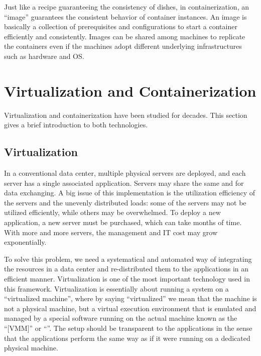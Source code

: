 Just like a recipe guaranteeing the consistency of dishes, in containerization, an ``image'' guarantees the consistent behavior of container instances. An image is basically a collection of prerequisites and configurations to start a container efficiently and consistently. Images can be shared among machines to replicate the containers even if the machines adopt different underlying infrastructures such as hardware and OS.

\section{Virtualization and Containerization}

Virtualization and containerization have been studied for decades. This section gives a brief introduction to both technologies.

\subsection{Virtualization}

In a conventional data center, multiple physical servers are deployed, and each server has a single associated application. Servers may share the same  and  for data exchanging. A big issue of this implementation is the utilization efficiency of the servers and the unevenly distributed loads: some of the servers may not be utilized efficiently, while others may be overwhelmed. To deploy a new application, a new server must be purchased, which can take months of time. With more and more servers, the management and IT cost may grow exponentially.

To solve this problem, we need a systematical and automated way of integrating the resources in a data center and re-distributed them to the applications in an efficient manner. Virtualization is one of the most important technology used in this framework. Virtualization is essentially about running a system on a ``virtualized machine'', where by saying ``virtualized'' we mean that the machine is not a physical machine, but a virtual execution environment that is emulated and managed by a special software running on the actual machine known as the ``[VMM]'' or ``''. The setup should be transparent to the applications in the sense that the applications perform the same way as if it were running on a dedicated physical machine.

